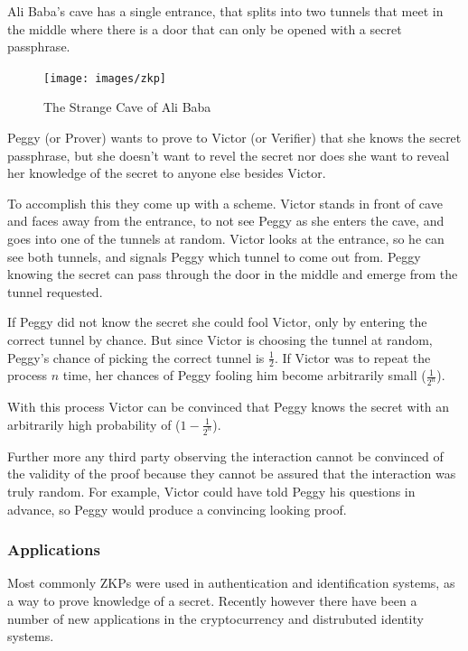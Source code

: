 \bigskip

Ali Baba's cave has a single entrance, that splits into two tunnels that meet in the middle where there is a door that can only be opened with a secret passphrase.

\begin{figure}[h]
	\centering
	\texttt{[image: images/zkp]}
	\caption{The Strange Cave of Ali Baba}
	\label{fig:strange-cave-of-alibaba}
\end{figure}


\bigskip

Peggy (or Prover) wants to prove to Victor (or Verifier) that she knows the secret passphrase, but she doesn't want to revel the secret nor does she want to reveal her knowledge of the secret to anyone else besides Victor.

\bigskip

To accomplish this they come up with a scheme.
Victor stands in front of cave and faces away from the entrance, to not see Peggy as she enters the cave, and goes into one of the tunnels at random.
Victor looks at the entrance, so he can see both tunnels, and signals Peggy which tunnel to come out from.
Peggy knowing the secret can pass through the door in the middle and emerge from the tunnel requested.

\bigskip

If Peggy did not know the secret she could fool Victor, only by entering the correct tunnel by chance.
But since Victor is choosing the tunnel at random, Peggy's chance of picking the correct tunnel is $\frac{1}{2}$. If Victor was to repeat the process $n$ time, her chances of Peggy fooling him become arbitrarily small ($\frac{1}{2^n}$).

With this process Victor can be convinced that Peggy knows the secret with an arbitrarily high probability of ($1 - \frac{1}{2^n}$).

\bigskip

Further more any third party observing the interaction cannot be convinced of the validity of the proof because they cannot be assured that the interaction was truly random. 
For example, Victor could have told Peggy his questions in advance, so Peggy would produce a convincing looking proof.

\subsubsection{Applications}
Most commonly ZKPs were used in authentication and identification systems, as a way to prove knowledge of a secret. 
Recently however there have been a number of new applications in the cryptocurrency and distrubuted identity systems.

